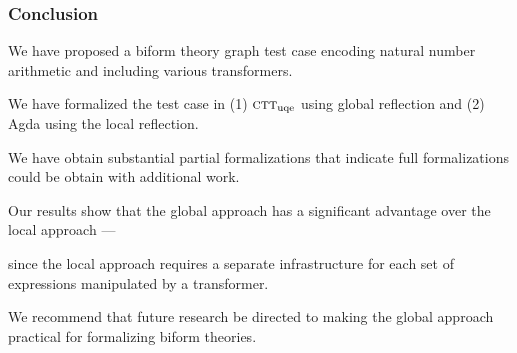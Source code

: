 \documentclass[t,12pt,numbers,fleqn]{beamer}
\newcommand{\churchuqe}{$\mbox{\sc ctt}_{\rm uqe}$}
\begin{document}
\begin{frame}
\begin{code}
\\
%
\\
\>    \AgdaSymbol{(} \AgdaSymbol{;} \AgdaSymbol{;} \AgdaSymbol{)}\<%
\\
\>  \<%
\\
\>[0]\<[2]%
\>[2] \AgdaSymbol{(} \AgdaSymbol{;}\<%
\\
\>[2]\<[9]%
\>[9] \AgdaSymbol{)}\<%
\end{code}
\end{frame}


\begin{frame}
\frametitle{Conclusion}
\bi

  \item We have proposed a biform theory graph test case encoding
    natural number arithmetic and including various transformers.

\pause

  \item We have formalized the test case in (1) {\churchuqe} using 
    global reflection and (2) Agda using the local reflection.

  \bi

    \item We have obtain substantial partial formalizations that
      indicate full formalizations could be obtain with additional
      work.

  \ei

\pause

  \item Our results show that the global approach has a significant
    advantage over the local approach ---

  \bi

    \item[] since the local approach requires a separate
      infrastructure for each set of expressions manipulated by a
      transformer.
 
  \ei

\pause

  \item We recommend that future research be directed to making the
    global approach practical for formalizing biform theories.

\ei
\end{frame}
\end{document}
